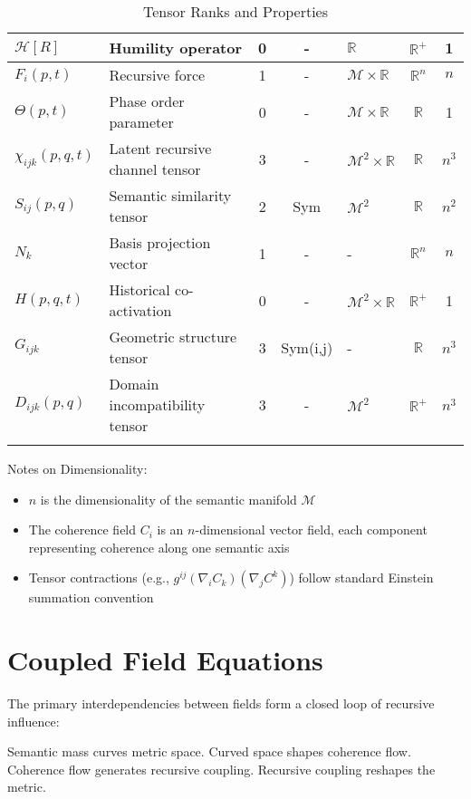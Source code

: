{\begin{longtable}{|p{2.5cm}|p{4cm}|c|c|p{2.5cm}|c|c|}
\hline
\(\mathcal{H}[R]\) & Humility operator & 0 & - & \(\mathbb{R}\) & \(\mathbb{R}^+\) & 1 \\
\hline
\(F_i(p,t)\) & Recursive force & 1 & - & \(\mathcal{M} \times \mathbb{R}\) & \(\mathbb{R}^n\) & \(n\) \\
\hline
\(\Theta(p,t)\) & Phase order parameter & 0 & - & \(\mathcal{M} \times \mathbb{R}\) & \(\mathbb{R}\) & 1 \\
\hline
\(\chi_{ijk}(p,q,t)\) & Latent recursive channel tensor & 3 & - & \(\mathcal{M}^2 \times \mathbb{R}\) & \(\mathbb{R}\) & \(n^3\) \\
\hline
\(S_{ij}(p,q)\) & Semantic similarity tensor & 2 & Sym & \(\mathcal{M}^2\) & \(\mathbb{R}\) & \(n^2\) \\
\hline
\(N_k\) & Basis projection vector & 1 & - & - & \(\mathbb{R}^n\) & \(n\) \\
\hline
\(H(p,q,t)\) & Historical co-activation & 0 & - & \(\mathcal{M}^2 \times \mathbb{R}\) & \(\mathbb{R}^+\) & 1 \\
\hline
\(G_{ijk}\) & Geometric structure tensor & 3 & Sym(i,j) & - & \(\mathbb{R}\) & \(n^3\) \\
\hline
\(D_{ijk}(p,q)\) & Domain incompatibility tensor & 3 & - & \(\mathcal{M}^2\) & \(\mathbb{R}^+\) & \(n^3\) \\
\hline
\caption{Tensor Ranks and Properties}
\end{longtable}
}

Notes on Dimensionality:
\begin{itemize}
    \item \(n\) is the dimensionality of the semantic manifold \(\mathcal{M}\)
    \item The coherence field \(C_i\) is an \(n\)-dimensional vector field, each component representing coherence along one semantic axis
    \item Tensor contractions (e.g., \(g^{ij}(\nabla_i C_k)(\nabla_j C^k)\)) follow standard Einstein summation convention
\end{itemize}

\section{Coupled Field Equations}

The primary interdependencies between fields form a closed loop of recursive influence:

Semantic mass curves metric space. \rightarrow Curved space shapes coherence flow. \rightarrow Coherence flow generates recursive coupling. \rightarrow Recursive coupling reshapes the metric.

